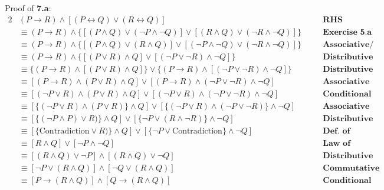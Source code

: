 \begin{enumerate}[label=(\alph*)]
    Proof of \textbf{7.a}:
    \begin{alignat*}{2}
        &(P \rightarrow R) \wedge [(P \leftrightarrow Q) \vee (R \leftrightarrow Q)] && \quad \textbf{RHS}\\
        &\equiv (P \rightarrow R) \wedge \{[(P \wedge Q) \vee (\neg P \wedge \neg Q)] \vee [(R \wedge Q) \vee (\neg R \wedge \neg Q)]\} && \quad \textbf{Exercise 5.a}\\
        &\equiv (P \rightarrow R) \wedge \{[(P \wedge Q) \vee (R \wedge Q)] \vee [(\neg P \wedge \neg Q) \vee (\neg R \wedge \neg Q)]\} && \quad \textbf{Associative/Commutative Laws}\\
        &\equiv (P \rightarrow R) \wedge \{[(P \vee R) \wedge Q] \vee [(\neg P \vee \neg R) \wedge \neg Q]\} && \quad \textbf{Distributive Law}\\
        &\equiv \{(P \rightarrow R) \wedge [(P \vee R) \wedge Q]\} \vee \{(P \rightarrow R) \wedge [(\neg P \vee \neg R) \wedge \neg Q]\} && \quad \textbf{Distributive Law}\\
        &\equiv [(P \rightarrow R) \wedge (P \vee R) \wedge Q] \vee [(P \rightarrow R) \wedge (\neg P \vee \neg R) \wedge \neg Q] && \quad \textbf{Associative Law}\\
        &\equiv [(\neg P \vee R) \wedge (P \vee R) \wedge Q] \vee [(\neg P \vee R) \wedge (\neg P \vee \neg R) \wedge \neg Q] && \quad \textbf{Conditional Law}\\
        &\equiv [\{(\neg P \vee R) \wedge (P \vee R)\} \wedge Q] \vee [\{(\neg P \vee R) \wedge (\neg P \vee \neg R)\} \wedge \neg Q] && \quad \textbf{Associative Law}\\
        &\equiv [\{(\neg P \wedge P) \vee R)\} \wedge Q] \vee [\{\neg P \vee (R \wedge \neg R)\} \wedge \neg Q] && \quad \textbf{Distributive Law}\\
        &\equiv [\{\text{Contradiction} \vee R)\} \wedge Q] \vee [\{\neg P \vee \text{Contradiction}\} \wedge \neg Q] && \quad \textbf{Def. of Contradiction}\\
        &\equiv [R \wedge Q] \vee [\neg P \wedge \neg Q] && \quad \textbf{Law of Contradiction}\\
        &\equiv [(R \wedge Q) \vee \neg P] \wedge [(R \wedge Q) \vee \neg Q] && \quad \textbf{Distributive Law}\\
        &\equiv [\neg P \vee (R \wedge Q)] \wedge [\neg Q \vee (R \wedge Q)] && \quad \textbf{Commutative Law}\\
        &\equiv [P \rightarrow (R \wedge Q)] \wedge [Q \rightarrow (R \wedge Q)] && \quad \textbf{Conditional Law}\\

\end{alignat*}
\end{enumerate}
